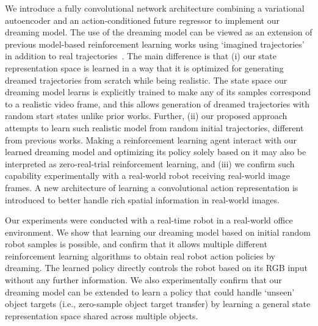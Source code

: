 \documentclass[letterpaper, 10 pt, conference]{ieeeconf}
\begin{document}
We introduce a fully convolutional network architecture combining a variational autoencoder and an action-conditioned future regressor to implement our dreaming model.
The use of the dreaming model can be viewed as an extension of previous model-based reinforcement learning works using `imagined trajectories' in addition to real trajectories~\cite{sutton1990integrated,heess2015learning,weber2017imagination}. The main difference is that (i) our state representation space is learned in a way that it is optimized for generating dreamed trajectories from scratch while being realistic.
The state space our dreaming model learns is explicitly trained to make any of its samples correspond to a realistic video frame, and this allows generation of dreamed trajectories with random start states unlike prior works. 
Further, (ii) our proposed approach attempts to learn such realistic model from random initial trajectories, different from previous works. Making a reinforcement learning agent interact with our learned dreaming model and optimizing its policy solely based on it may also be interpreted as zero-real-trial reinforcement learning, and (iii) we confirm such capability experimentally with a real-world robot receiving real-world image frames. A new architecture of learning a convolutional action representation is introduced to better handle rich spatial information in real-world images.


Our experiments were conducted with a real-time robot in a real-world office environment. We show that learning our dreaming model based on initial random robot samples is possible, and confirm that it allows multiple different reinforcement learning algorithms to obtain real robot action policies by dreaming. The learned policy directly controls the robot based on its RGB input without any further information. We also experimentally confirm that our dreaming model can be extended to learn a policy that could handle `unseen' object targets (i.e., zero-sample object target transfer) by learning a general state representation space shared across multiple objects.

\end{document}
